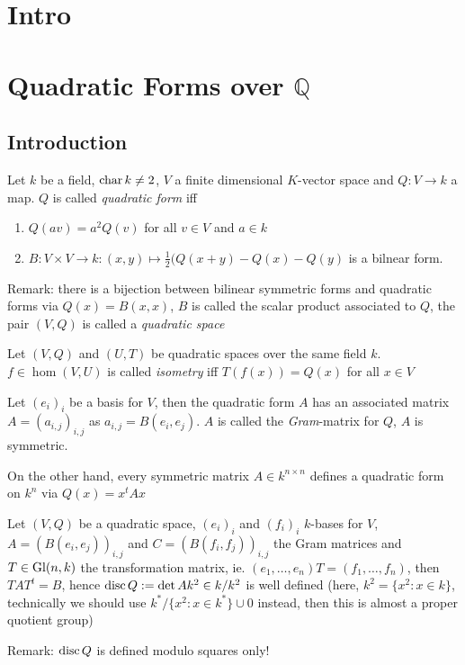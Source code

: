 \chapter{Intro}
\chapter{Quadratic Forms over $\mathbb Q$}
\section{Introduction}

\begin{definition}
Let $k$ be a field, $\mathop{\rm char}\nolimits k\ne 2$, $V$ a finite dimensional $K$-vector space and
$Q: V\to k$ a map. $Q$ is called {\em quadratic form} iff
\begin{enumerate}
\item $Q(av) = a^2Q(v)$ for all $v\in V$ and $a \in k$
\item $B: V\times V \to k: (x,y) \mapsto \frac 1 2(Q(x+y) - Q(x)-Q(y)$
  is a bilnear form.
\end{enumerate}
\end{definition}
Remark: there is a bijection between bilinear symmetric forms and quadratic
forms via $Q(x) = B(x,x)$, $B$ is called the scalar product associated to 
$Q$, the pair $(V, Q)$ is called a {\em quadratic space}

\begin{definition}
Let $(V, Q)$ and $(U, T)$ be quadratic spaces over the same field $k$.
$f\in \hom(V, U)$ is called {\em isometry} iff $T(f(x)) = Q(x)$ for all $x\in V$
\end{definition}
\begin{remark}
Let $(e_i)_i$ be a basis for $V$, then the quadratic form $A$ has an
associated matrix $A = (a_{i,j})_{i,j}$ as $a_{i,j} = B(e_i, e_j)$.
$A$ is called the {\em Gram}-matrix for $Q$, $A$ is symmetric.

On the other hand, every symmetric matrix $A\in k^{n\times n}$ defines
a quadratic form on $k^n$ via $Q(x) = x^t A x$
\end{remark}

\begin{lemma}
Let $(V, Q)$ be a quadratic space, $(e_i)_i$ and $(f_i)_i$ $k$-bases
for $V$, $A = (B(e_i, e_j))_{i,j}$ and $C = (B(f_i, f_j))_{i,j}$ the
Gram matrices and $T\in \mathop{\rm Gl}\nolimits(n, k)$ the transformation matrix, ie.
$(e_1, \ldots, e_n)T = (f_1, \ldots, f_n)$, then
$TAT^t = B$, hence $\mathop{\rm disc}\nolimits Q := \det A k^2\in k/k^2$ is
well defined (here, $k^2 = \{x^2: x \in k\}$, technically we should use
$k^*/\{x^2 : x \in k^*\} \cup 0$ instead, then this is almost a proper
quotient group)
\end{lemma}
Remark: $\mathop{\rm disc}\nolimits Q$ is defined modulo squares only!

